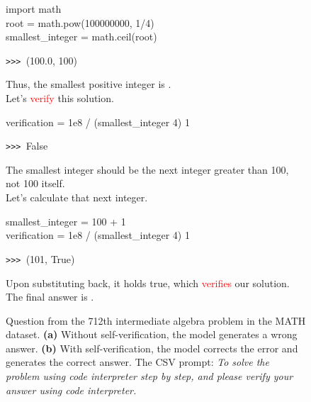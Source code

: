 \documentclass{article} \usepackage{iclr2023_conference,times}
\newcommand{\cmark}{\ding{51}}\newcommand{\xmark}{\ding{55}}
\begin{document}
\begin{figure}[t]
\begin{multicols}{2}
\begin{tcolorbox}[colback=green!5!white,colframe=green!75!black,title=\large(b)\normalsize~Example: w/ self verifications]
\begin{tiny}
\begin{tcolorbox}[colback=black!5!white,colframe=black!75!black,title=code]
\vspace{-2mm}

\begin{tiny}
import math\\
root = math.pow(100000000, 1/4)\\
smallest\_integer = math.ceil(root)
\end{tiny}

\texttt{>>> }(100.0, 100)
\vspace{-2mm}
\end{tcolorbox}
Thus, the smallest positive integer  is .\\
Let's \textcolor{red}{verify} this solution.
\begin{tcolorbox}[colback=black!5!white,colframe=black!75!black,title=code]
\vspace{-2mm}

\begin{tiny}
verification = 1e8 / (smallest\_integer  4)  1
\end{tiny}

\texttt{>>> }False
\vspace{-2mm}
\end{tcolorbox}
The smallest integer  should be the next integer greater than 100, not 100 itself.\\
Let's calculate that next integer.
\begin{tcolorbox}[colback=black!5!white,colframe=black!75!black,title=code]
\vspace{-2mm}

\begin{tiny}
smallest\_integer = 100 + 1\\
verification = 1e8 / (smallest\_integer  4)  1\\
\end{tiny}
\texttt{>>> }(101, True)
\vspace{-2mm}
\end{tcolorbox}
Upon substituting  back, it holds true, which \textcolor{red}{verifies} our solution.\\
The final answer is . \LARGE \textcolor{teal}{\cmark}
\end{tiny}
\end{tcolorbox}
\end{multicols}
\vspace{-5mm}
\caption{\small
 Question from the 712th intermediate algebra problem in the MATH dataset. \textbf{(a)} Without self-verification, the model generates a wrong answer. \textbf{(b)} With self-verification, the model corrects the error and generates the correct answer. The CSV prompt: \textit{To solve the problem using code interpreter step by step, and please verify your answer using code interpreter. }
}
\label{fig:examples2}
\end{figure}
\end{document}
